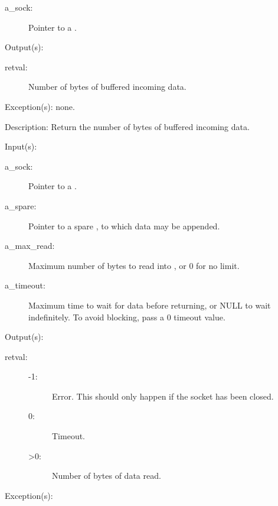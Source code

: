 \begin{capi}
\begin{capilist}
\begin{description}
		\item[a\_sock: ]
			Pointer to a .
		\end{description}
	\item[Output(s): ]
		\begin{description}\item[]
		\item[retval: ]
			Number of bytes of buffered incoming data.
		\end{description}
	\item[Exception(s): ] none.
	\item[Description: ]
		Return the number of bytes of buffered incoming data.
	\end{capilist}
\label{sock_read}
	\begin{capilist}
	\item[Input(s): ]
		\begin{description}\item[]
		\item[a\_sock: ]
			Pointer to a .
		\item[a\_spare: ]
			Pointer to a spare , to which data may be
			appended.
		\item[a\_max\_read: ]
			Maximum number of bytes to read into , or
			0 for no limit.
		\item[a\_timeout: ]
			Maximum time to wait for data before returning, or NULL
			to wait indefinitely.  To avoid blocking, pass a 0
			timeout value.
		\end{description}
	\item[Output(s): ]
		\begin{description}\item[]
		\item[retval: ]
			\begin{description}\item[]
			\item[-1: ]
				Error.  This should only happen if the socket
				has been closed.
			\item[0: ]
				Timeout.
			\item[>0: ]
				Number of bytes of data read.
			\end{description}
		\end{description}
	\item[Exception(s): ]
		\begin{description}\item[]

\end{description}
\end{capilist}
\end{capi}
